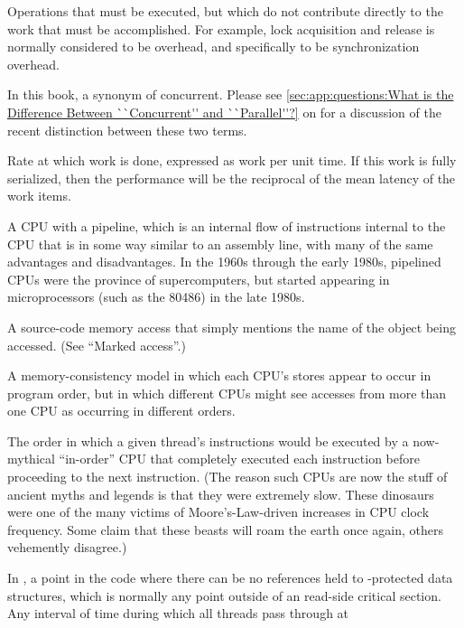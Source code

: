 \begin{description}
	Operations that must be executed, but which do not contribute
	directly to the work that must be accomplished.
	For example, lock acquisition and release is normally considered
	to be overhead, and specifically to be synchronization overhead.
\item[\IXG{Parallel}:]
	In this book, a synonym of concurrent.
	Please see \cref{sec:app:questions:What is the Difference Between ``Concurrent'' and ``Parallel''?}
	on 
	for a discussion of the recent distinction between these two
	terms.
\item[\IXG{Performance}:]
	Rate at which work is done, expressed as work per unit time.
	If this work is fully serialized, then the performance will
	be the reciprocal of the mean latency of the work items.
\item[\IXGr{Pipelined CPU}:]
	A CPU with a pipeline, which is
	an internal flow of instructions internal to the CPU that
	is in some way similar to an assembly line, with many of
	the same advantages and disadvantages.
	In the 1960s through the early 1980s, pipelined CPUs were the
	province of supercomputers, but started appearing in microprocessors
	(such as the 80486) in the late 1980s.
\item[\IXG{Plain Access}:]
	A source-code memory access that simply mentions the name of
	the object being accessed.
	(See ``Marked access''.)
\item[\IXGh{Process}{Consistency}:]
	A memory-consistency model in which each CPU's stores appear to
	occur in program order, but in which different CPUs might see
	accesses from more than one CPU as occurring in different orders.
\item[\IXG{Program Order}:]
	The order in which a given thread's instructions
	would be executed by a now-mythical ``in-order'' CPU that
	completely executed each instruction before proceeding to
	the next instruction.
	(The reason such CPUs are now the stuff of ancient myths
	and legends is that they were extremely slow.
	These dinosaurs were one of the many victims of
	Moore's-Law-driven increases in CPU clock frequency.
	Some claim that these beasts will roam the earth once again,
	others vehemently disagree.)
\item[\IXG{Quiescent State}:]
	In , a point in the code where there can be no references held
	to -protected data structures, which is normally any point
	outside of an  read-side critical section.
	Any interval of time during which all threads pass through at

\end{description}
